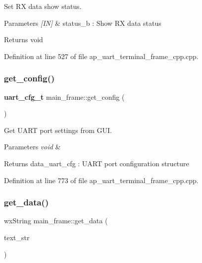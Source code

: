 Set RX data show status. 


\begin{DoxyParams}{Parameters}
{\em \mbox{[}\+I\+N\mbox{]}} & status\+\_\+b \+: Show RX data status \\
\hline
\end{DoxyParams}
\begin{DoxyReturn}{Returns}
void 
\end{DoxyReturn}


Definition at line 527 of file ap\+\_\+uart\+\_\+terminal\+\_\+frame\+\_\+cpp.\+cpp.

\mbox{\label{group___u_a_r_t__terminal_gaf35761b36e4263c36d35a49a2375666b}} 
\subsubsection{get\_config()}
{\footnotesize\ttfamily \textbf{ uart\+\_\+cfg\+\_\+t} main\+\_\+frame\+::get\+\_\+config (\begin{DoxyParamCaption}\item[{void}]{ }\end{DoxyParamCaption})}



Get U\+A\+RT port settings from G\+UI. 


\begin{DoxyParams}{Parameters}
{\em void} & \\
\hline
\end{DoxyParams}
\begin{DoxyReturn}{Returns}
data\+\_\+uart\+\_\+cfg \+: U\+A\+RT port configuration structure 
\end{DoxyReturn}


Definition at line 773 of file ap\+\_\+uart\+\_\+terminal\+\_\+frame\+\_\+cpp.\+cpp.

\mbox{\label{group___u_a_r_t__terminal_ga43496ccf45eeb40836e421687fa10729}} 
\subsubsection{get\_data()}
{\footnotesize\ttfamily wx\+String main\+\_\+frame\+::get\+\_\+data (\begin{DoxyParamCaption}\item[{wx\+String}]{text\+\_\+str }\end{DoxyParamCaption})}



